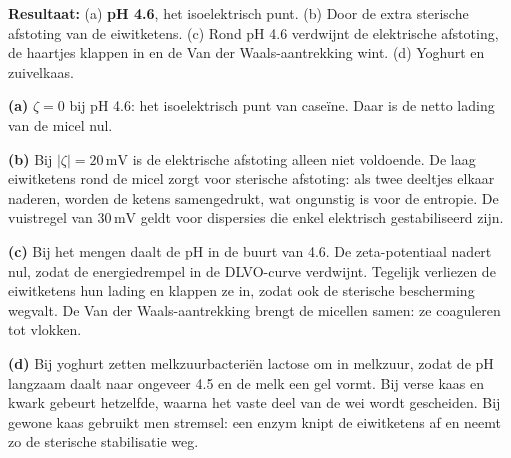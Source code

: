 \begin{oplossing}
\textbf{Resultaat:} (a) \textbf{pH 4.6}, het isoelektrisch punt. (b) Door de extra sterische afstoting van de eiwitketens. (c) Rond pH 4.6 verdwijnt de elektrische afstoting, de haartjes klappen in en de Van der Waals-aantrekking wint. (d) Yoghurt en zuivelkaas.

\textbf{(a)} \(\zeta = 0\) bij pH 4.6: het isoelektrisch punt van caseïne. Daar is de netto lading van de micel nul.

\textbf{(b)} Bij \(|\zeta| = 20\,\mathrm{mV}\) is de elektrische afstoting alleen niet voldoende. De laag eiwitketens rond de micel zorgt voor sterische afstoting: als twee deeltjes elkaar naderen, worden de ketens samengedrukt, wat ongunstig is voor de entropie. De vuistregel van \(30\,\mathrm{mV}\) geldt voor dispersies die enkel elektrisch gestabiliseerd zijn.

\textbf{(c)} Bij het mengen daalt de pH in de buurt van 4.6. De zeta-potentiaal nadert nul, zodat de energiedrempel in de DLVO-curve verdwijnt. Tegelijk verliezen de eiwitketens hun lading en klappen ze in, zodat ook de sterische bescherming wegvalt. De Van der Waals-aantrekking brengt de micellen samen: ze coaguleren tot vlokken.

\textbf{(d)} Bij yoghurt zetten melkzuurbacteriën lactose om in melkzuur, zodat de pH langzaam daalt naar ongeveer 4.5 en de melk een gel vormt. Bij verse kaas en kwark gebeurt hetzelfde, waarna het vaste deel van de wei wordt gescheiden. Bij gewone kaas gebruikt men stremsel: een enzym knipt de eiwitketens af en neemt zo de sterische stabilisatie weg.
\end{oplossing}

